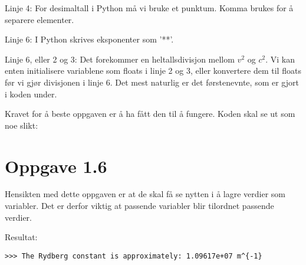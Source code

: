 \documentclass[10pt,a4paper]{article}
\begin{document}
Linje 4: For desimaltall i Python må vi bruke et punktum. Komma brukes for å separere elementer.

Linje 6: I Python skrives eksponenter som '**'.

Linje 6, eller 2 og 3: Det forekommer en heltallsdivisjon mellom $v^2$ og $c^2$. Vi kan enten initialisere variablene som floats i linje 2 og 3, eller konvertere dem til floats før vi gjør divisjonen i linje 6. Det mest naturlig er det førstenevnte, som er gjort i koden under.

Kravet for å beste oppgaven er å ha fått den til å fungere. Koden skal se ut som noe slikt:


\section*{Oppgave 1.6}
Hensikten med dette oppgaven er at de skal få se nytten i å lagre verdier som variabler. Det er derfor viktig at passende variabler blir tilordnet passende verdier. 

Resultat:
\begin{verbatim}
>>> The Rydberg constant is approximately: 1.09617e+07 m^{-1}
\end{verbatim}
\end{document}
